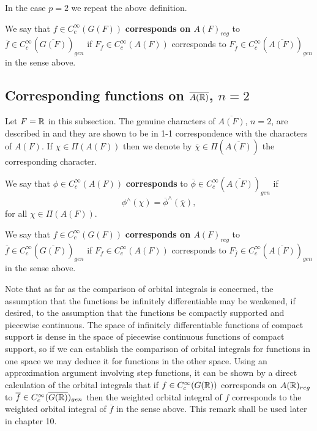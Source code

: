 In the case $p=2$ we repeat the above definition.

\begin{definition} We say that
$f \in C_c^\infty(G(F))$ {\bf corresponds on $A(F)_{reg}$} to
$\overline{f}\in C_c^\infty(\overline{G(F)})_{gen}$
if $F_f\in C_c^\infty(A(F))$ corresponds to
$F_{\overline{f}}\in C_c^\infty(\overline{A(F)})_{gen}$
in the sense above.
\end{definition}

\subsection{Corresponding functions on
$\overline{A({\Bbb{R}})}$, $n=2$}

Let $F={\Bbb{R}}$ in this subsection.
The genuine characters of $\overline{A(F)}$, $n=2$, are
described in \cite{GS} and they are shown to be in 1-1 correspondence with
the characters of $A(F)$.
If $\chi\in \Pi(A(F))$ then
we denote by $\overline{\chi}\in \Pi(\overline{A(F)})$
the corresponding character.

\begin{definition}
We say that $\phi \in C_c^\infty(A(F))$ {\bf corresponds} to
$\overline{\phi}\in C_c^\infty(\overline{A(F)})_{gen}$
if
\[
\phi^{\wedge}(\chi)=
\overline{\phi}^{\wedge}(\overline{\chi}),
\]
for all $\chi \in \Pi(A(F))$.
\end{definition}

\begin{definition} We say that
$f \in C_c^\infty(G(F))$ {\bf corresponds on $A(F)_{reg}$} to
$\overline{f}\in C_c^\infty(\overline{G(F)})_{gen}$
if $F_f\in C_c^\infty(A(F))$ corresponds to
$F_{\overline{f}}\in C_c^\infty(\overline{A(F)})_{gen}$
in the sense above.
\end{definition}

Note that as far as the comparison of orbital integrals is concerned,
the assumption that the functions be infinitely differentiable
may be weakened, if desired, to the assumption that the
functions be compactly supported and piecewise
continuous. The space of infinitely differentiable
functions of compact support is dense in the space of
piecewise continuous functions of compact support, so if we can
establish the comparison of orbital integrals for functions
in one space we may deduce it for functions in the
other space. Using an approximation argument involving
step functions, it can be
shown by a direct calculation of the orbital integrals that if
$f \in C_c^\infty(G({\Bbb{R}}))$ corresponds on
$A({\Bbb{R}})_{reg}$ to
$\overline{f}\in C_c^\infty(\overline{G({\Bbb{R}})})_{gen}$
then the weighted orbital integral of
$f$ corresponds to the weighted orbital integral of
$\overline{f}$ in the sense above.
This remark shall be used later in chapter 10.

